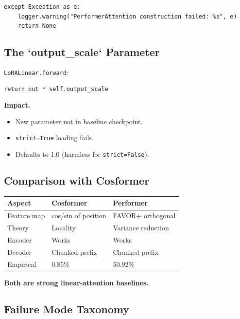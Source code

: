 \begin{lstlisting}
except Exception as e:
    logger.warning("PerformerAttention construction failed: %s", e)
    return None
\end{lstlisting}

\subsection{The `output\_scale` Parameter}

\texttt{LoRALinear.forward}:

\begin{lstlisting}
return out * self.output_scale
\end{lstlisting}

\textbf{Impact.}

\begin{itemize}
\item New parameter not in baseline checkpoint.
\item \texttt{strict=True} loading fails.
\item Defaults to 1.0 (harmless for \texttt{strict=False}).

\end{itemize}
\subsection{Comparison with Cosformer}

\begin{table}[H]
\centering
\small
\begin{tabular}{lll}
\toprule
\textbf{Aspect} & \textbf{Cosformer} & \textbf{Performer} \\
\midrule
Feature map & cos/sin of position & FAVOR+ orthogonal \\
Theory & Locality & Variance reduction \\
Encoder & Works & Works \\
Decoder & Chunked prefix & Chunked prefix \\
Empirical & 0.85\% & 50.92\% \\
\bottomrule
\end{tabular}
\end{table}

\textbf{Both are strong linear-attention baselines.}

\subsection{Failure Mode Taxonomy}

